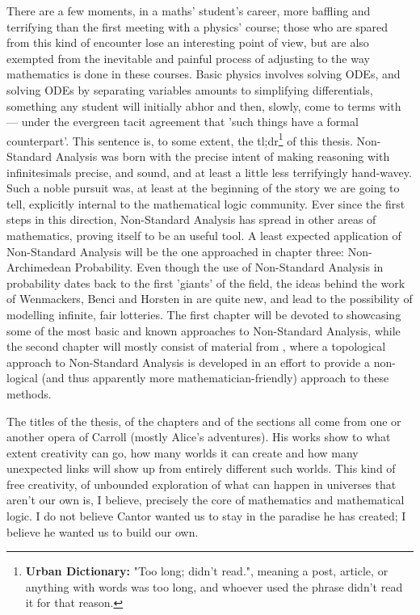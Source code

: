 \documentclass[a4paper,50 pt,titlepage,twoside,colorlinks=true,allcolors=circusroyale4]{book}
\begin{document}
There are a few moments, in a maths' student's career, more baffling and terrifying than the first meeting with a physics' course; those who are spared from this kind of encounter lose an interesting point of view, but are also exempted from the inevitable and painful process of adjusting to the way mathematics is done in these courses. Basic physics involves solving ODEs, and solving ODEs by separating variables amounts to simplifying differentials, something any student will initially abhor and then, slowly, come to terms with --- under the evergreen tacit agreement that 'such things have a formal counterpart'. This sentence is, to some extent, the tl;dr\footnote{\textbf{Urban Dictionary:} "Too long; didn't read.", meaning a post, article, or anything with words was too long, and whoever used the phrase didn't read it for that reason.} of this thesis. Non-Standard Analysis was born with the precise intent of making reasoning with infinitesimals precise, and sound, and at least a little less terrifyingly hand-wavey. Such a noble pursuit was, at least at the beginning of the story we are going to tell, explicitly internal to the mathematical logic community. Ever since the first steps in this direction, Non-Standard Analysis has spread in other areas of mathematics, proving itself to be an useful tool. A least expected application of Non-Standard Analysis will be the one approached in chapter three: Non-Archimedean Probability. Even though the use of Non-Standard Analysis in probability dates back to the first 'giants' of the field, the ideas behind the work of Wenmackers, Benci and Horsten in \cite{infprob} are quite new, and lead to the possibility of modelling infinite, fair lotteries. The first chapter will be devoted to showcasing some of the most basic and known approaches to Non-Standard Analysis, while the second chapter will mostly consist of material from \cite{NAM}, where a topological approach to Non-Standard Analysis is developed in an effort to provide a non-logical (and thus apparently more mathematician-friendly) approach to these methods.
\par The titles of the thesis, of the chapters and of the sections all come from one or another opera of Carroll (mostly Alice's adventures). His works show to what extent creativity can go, how many worlds it can create and how many unexpected links will show up from entirely different such worlds. This kind of free creativity, of unbounded exploration of what can happen in universes that aren't our own is, I believe, precisely the core of mathematics and mathematical logic. I do not believe Cantor wanted us to stay in the paradise he has created; I believe he wanted us to build our own.
\end{document}
